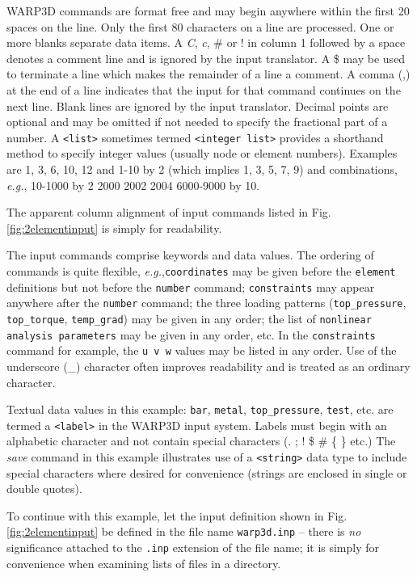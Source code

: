 \documentclass[11pt]{report}
\numberwithin{equation}{section}
\newcommand{\ttt} {\texttt}  %
\newcommand{\eg}{\emph{e.g.},\xspace}
\newcommand{\ti}{\emph}
\newcommand{\Fig}{{Fig.}\xspace}
\begin{document}
{WARP3D commands are format free and may begin anywhere within the first 20 spaces 
on the line. Only the first 80 characters on a line are processed.
One or more blanks separate data items. A \ti{C}, \ti{c}, \# or ! in column 1
followed by a space denotes 
a comment line and is ignored by the input translator.  A \$ may be used to terminate a line
which makes the remainder of a line a comment.
A comma (,) at the end of a line indicates that the input for that command continues 
on the next line. Blank lines are ignored by the input translator. 
Decimal points are optional and may be omitted if not needed to specify the fractional part of a number. 
A \ttt{<list>} sometimes termed \ttt{<integer\ list>}  provides a shorthand method to specify 
integer values (usually node or element numbers). Examples are 1, 3, 6, 10, 12 and 1-10 by 2 
(which implies 1, 3, 5, 7, 9) and combinations, \eg 10-1000 by 2 2000 2002 2004 6000-9000 by 10.

The apparent column alignment of input commands listed in \Fig \ref{fig:2elementinput}
is simply for readability.

The input commands comprise keywords and data values. The ordering of commands is quite
flexible, \eg \ttt{coordinates} may be given before the \ttt{element} definitions but not before the
\ttt{number} command; \ttt{constraints} may appear anywhere after the \ttt{number} command; the three
loading patterns (\ttt{top\_pressure}, \ttt{top\_torque}, \ttt{temp\_grad})  may be given 
in any order; the list of \ttt{nonlinear analysis parameters} may be given 
in any order, etc. In the \ttt{constraints} command for example, the \ttt{u  v w}
values may be listed in any order.
Use of the underscore (\_) character often improves readability and is treated as an ordinary
character.

Textual data values in this example: \ttt{bar}, \ttt{metal}, \ttt{top\_pressure}, \ttt{test}, etc. are termed a
\ttt{<label>} in the WARP3D input system. Labels must begin with an alphabetic character and not contain special
characters (. ; ! \$ \# \* \{ \} etc.) The \ti{save} command in this example illustrates use of 
a \ttt{<string>} data type to include special characters where desired for convenience (strings are
enclosed in single or double quotes).

To continue with this example, let the input definition shown in \Fig \ref{fig:2elementinput}
be defined in the file name \ttt{warp3d.inp} -- there is \ti{no} 
significance attached to the \ttt{.inp} extension of the file name; it is simply 
for convenience when examining lists
of files in a directory.

}
\end{document}
